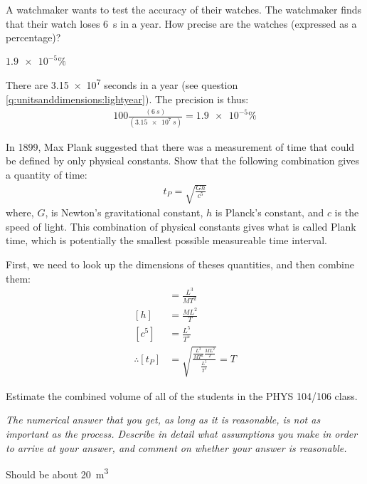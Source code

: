 \question A watchmaker wants to test the accuracy of their watches. The watchmaker finds that their watch loses \SI{6}{s} in a year. How precise are the watches (expressed as a percentage)?

\begin{finalanswer}
$\num{1.9e-5}\%$
\end{finalanswer}

\begin{solution}
There are \num{3.15e7} seconds in a year (see question \ref{q:unitsanddimensions:lightyear}). The precision is thus:
\begin{align*}
100\frac{(\SI{6}{s})}{(\SI{3.15e7}{s})}=\num{1.9e-5}\%
\end{align*}
\end{solution}


\question In 1899, Max Plank suggested that there was a measurement of time that could be defined by only physical constants. Show that the following combination gives a quantity of time:
\begin{align*}
t_P=\sqrt{\frac{Gh}{c^5}}
\end{align*}
where, $G$, is Newton's gravitational constant, $h$ is Planck's constant, and $c$ is the speed of light. This combination of physical constants gives what is called Plank time, which is potentially the smallest possible measureable time interval.

\begin{solution}
First, we need to look up the dimensions of theses quantities, and then combine them:
\begin{align*}
[G]&=\frac{L^3}{MT^2}\\
[h]&=\frac{ML^2}{T}\\
[c^5]&=\frac{L^5}{T^5}\\
\therefore [t_P]&=\sqrt{\frac{\frac{L^3}{MT^2}\frac{ML^2}{T}}{\frac{L^5}{T^5}}}=T
\end{align*}
\end{solution}

\question Estimate the combined volume of all of the students in the PHYS 104/106 class. 

\textit{The numerical answer that you get, as long as it is reasonable, is not as important as the process. Describe in detail what assumptions you make in order to arrive at your answer, and comment on whether your answer is reasonable.}

\begin{finalanswer}
Should be about \SI{20}{m^3}
\end{finalanswer}

